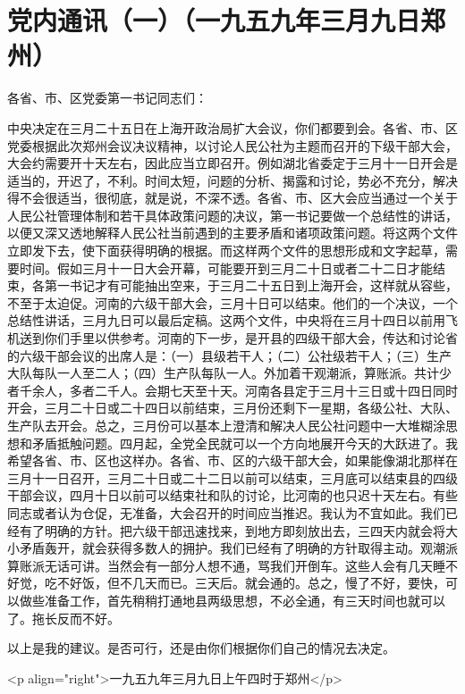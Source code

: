 \section[党内通讯（一）（一九五九年三月九日郑州）]{党内通讯（一）（一九五九年三月九日郑州）}


各省、市、区党委第一书记同志们：

中央决定在三月二十五日在上海开政治局扩大会议，你们都要到会。各省、市、区党委根据此次郑州会议决议精神，以讨论人民公社为主题而召开的下级干部大会，大会约需要开十天左右，因此应当立即召开。例如湖北省委定于三月十一日开会是适当的，开迟了，不利。时间太短，问题的分析、揭露和讨论，势必不充分，解决得不会很适当，很彻底，就是说，不深不透。各省、市、区大会应当通过一个关于人民公社管理体制和若干具体政策问题的决议，第一书记要做一个总结性的讲话，以便又深又透地解释人民公社当前遇到的主要矛盾和诸项政策问题。将这两个文件立即发下去，使下面获得明确的根据。而这样两个文件的思想形成和文字起草，需要时间。假如三月十一日大会开幕，可能要开到三月二十日或者二十二日才能结束，各第一书记才有可能抽出空来，于三月二十五日到上海开会，这样就从容些，不至于太迫促。河南的六级干部大会，三月十日可以结束。他们的一个决议，一个总结性讲话，三月九日可以最后定稿。这两个文件，中央将在三月十四日以前用飞机送到你们手里以供参考。河南的下一步，是开县的四级干部大会，传达和讨论省的六级干部会议的出席人是：（一）县级若干人；（二）公社级若干人；（三）生产大队每队一人至二人；（四）生产队每队一人。外加着干观潮派，算账派。共计少者千余人，多者二千人。会期七天至十天。河南各县定于三月十三日或十四日同时开会，三月二十日或二十四日以前结束，三月份还剩下一星期，各级公社、大队、生产队去开会。总之，三月份可以基本上澄清和解决人民公社问题中一大堆糊涂思想和矛盾抵触问题。四月起，全党全民就可以一个方向地展开今天的大跃进了。我希望各省、市、区也这样办。各省、市、区的六级干部大会，如果能像湖北那样在三月十一日召开，三月二十日或二十二日以前可以结束，三月底可以结束县的四级干部会议，四月十日以前可以结束社和队的讨论，比河南的也只迟十天左右。有些同志或者认为仓促，无准备，大会召开的时间应当推迟。我认为不宜如此。我们已经有了明确的方针。把六级干部迅速找来，到地方即刻放出去，三四天内就会将大小矛盾轰开，就会获得多数人的拥护。我们已经有了明确的方针取得主动。观潮派算账派无话可讲。当然会有一部分人想不通，骂我们开倒车。这些人会有几天睡不好觉，吃不好饭，但不几天而已。三天后。就会通的。总之，慢了不好，要快，可以做些准备工作，首先稍稍打通地县两级思想，不必全通，有三天时间也就可以了。拖长反而不好。

以上是我的建议。是否可行，还是由你们根据你们自己的情况去决定。

<p align="right">一九五九年三月九日上午四时于郑州</p>



